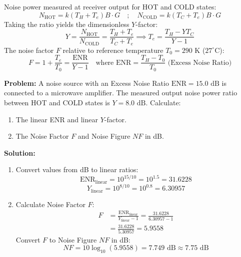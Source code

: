 \documentclass[12pt,a4paper]{article}
\begin{document}
\begin{tcolorbox}[formulabox, title={Y-Factor Derivation \& Noise Figure Equations}]
  Noise power measured at receiver output for HOT and COLD states:
  \begin{equation}
    N_{\text{HOT}} = k (T_H + T_e) B \cdot G \quad ; \quad N_{\text{COLD}} = k (T_C + T_e) B \cdot G
  \end{equation}
  Taking the ratio yields the dimensionless $Y$-factor:
  \begin{equation}
    Y = \frac{N_{\text{HOT}}}{N_{\text{COLD}}} = \frac{T_H + T_e}{T_C + T_e} \implies T_e = \frac{T_H - Y T_C}{Y - 1}
  \end{equation}
  The noise factor $F$ relative to reference temperature $T_0 = 290\text{ K}$ ($27^\circ\text{C}$):
  \begin{equation}
    F = 1 + \frac{T_e}{T_0} = \frac{\text{ENR}}{Y - 1} \quad \text{where } \text{ENR} = \frac{T_H - T_0}{T_0} \text{ (Excess Noise Ratio)}
  \end{equation}
\end{tcolorbox}

\begin{tcolorbox}[examplebox, title={Worked Numerical: Noise Figure Calculation via Y-Factor Method}]
  \textbf{Problem:} A noise source with an Excess Noise Ratio $\text{ENR} = 15.0\text{ dB}$ is connected to a microwave amplifier. The measured output noise power ratio between HOT and COLD states is $Y = 8.0\text{ dB}$. Calculate:
  \begin{enumerate}[label=(\alph*), noitemsep]
    \item The linear ENR and linear $Y$-factor.
    \item The Noise Factor $F$ and Noise Figure $NF$ in dB.
  \end{enumerate}
  \tcblower
  \textbf{Solution:}
  \begin{enumerate}[label=(\alph*), itemsep=4pt]
    \item Convert values from dB to linear ratios:
      \begin{equation}
        \text{ENR}_{\text{linear}} = 10^{15/10} = 10^{1.5} = 31.6228
      \end{equation}
      \begin{equation}
        Y_{\text{linear}} = 10^{8/10} = 10^{0.8} = 6.30957
      \end{equation}
    \item Calculate Noise Factor $F$:
      \begin{equation}
        \begin{aligned}
          F &= \frac{\text{ENR}_{\text{linear}}}{Y_{\text{linear}} - 1} = \frac{31.6228}{6.30957 - 1} \\
          &= \frac{31.6228}{5.30957} = 5.9558
        \end{aligned}
      \end{equation}
      Convert $F$ to Noise Figure $NF$ in dB:
      \begin{equation}
        NF = 10 \log_{10}(5.9558) = 7.749\text{ dB} \approx 7.75\text{ dB}
      \end{equation}
  \end{enumerate}
\end{tcolorbox}
\end{document}
